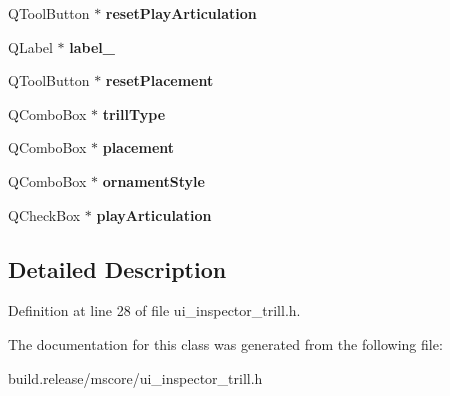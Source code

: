 \begin{DoxyCompactItemize}
Q\+Tool\+Button $\ast$ {\bfseries reset\+Play\+Articulation}
\item 
\mbox{\label{class_ui___inspector_trill_a6172803e0d2524fc126acb148820e663}} 
Q\+Label $\ast$ {\bfseries label\+\_}
\item 
\mbox{\label{class_ui___inspector_trill_a7c0132e5e6c53481f8284ced3695dd0e}} 
Q\+Tool\+Button $\ast$ {\bfseries reset\+Placement}
\item 
\mbox{\label{class_ui___inspector_trill_aab4f3fd6d9a907f7cb5c0053f0ee1d0f}} 
Q\+Combo\+Box $\ast$ {\bfseries trill\+Type}
\item 
\mbox{\label{class_ui___inspector_trill_ac8c26b79e0baf2c62918371fb7df4b54}} 
Q\+Combo\+Box $\ast$ {\bfseries placement}
\item 
\mbox{\label{class_ui___inspector_trill_a5472df70a35e7b73574d95eb1fd92ba9}} 
Q\+Combo\+Box $\ast$ {\bfseries ornament\+Style}
\item 
\mbox{\label{class_ui___inspector_trill_ada7298e6c4cb99ac544408fdfc6720cf}} 
Q\+Check\+Box $\ast$ {\bfseries play\+Articulation}
\end{DoxyCompactItemize}


\subsection{Detailed Description}


Definition at line 28 of file ui\+\_\+inspector\+\_\+trill.\+h.



The documentation for this class was generated from the following file\+:\begin{DoxyCompactItemize}
\item 
build.\+release/mscore/ui\+\_\+inspector\+\_\+trill.\+h\end{DoxyCompactItemize}
